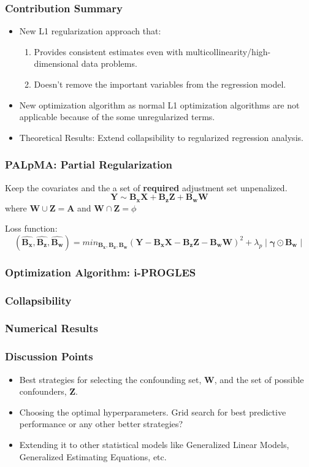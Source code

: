 \documentclass{beamer}
\begin{document}
\begin{frame}
	\frametitle{Contribution Summary}
	\begin{itemize}
		\item New L1 regularization approach that:
			\begin{enumerate}
				\item Provides consistent estimates even with
					multicollinearity/high-dimensional data
					problems.
				\item Doesn't remove the important variables
					from the regression model.
			\end{enumerate}
		\item New optimization algorithm as normal L1 optimization algorithms are not applicable because of the some unregularized terms.
		\item Theoretical Results: Extend collapsibility to regularized regression analysis.
	\end{itemize}
\end{frame}

\begin{frame}
	\frametitle{PALpMA: Partial Regularization}
	Keep the covariates and the a set of \textbf{required} adjustment set unpenalized.
	$$ \bm{Y} \sim \bm{B_x X} + \bm{B_z Z} + \bm{B_w W} $$ 
	where $ \bm{W} \cup \bm{Z} = \bm{A} $ and $ \bm{W} \cap \bm{Z} = \phi $
	
	Loss function:
	$$ (\bm{\hat{B_x}}, \bm{\hat{B_z}}, \bm{\hat{B_w}}) = min_{\bm{B_x}, \bm{B_z}, \bm{B_w}} (\bm{Y} - \bm{B_x X} - \bm{B_z Z} - \bm{B_w W})^2 + \lambda_p \mid \bm{\gamma} \odot \bm{B_w} \mid $$

\end{frame}

\begin{frame}
	\frametitle{Optimization Algorithm: i-PROGLES}
\end{frame}

\begin{frame}
	\frametitle{Collapsibility}
\end{frame}

\begin{frame}
	\frametitle{Numerical Results}
\end{frame}

\begin{frame}
	\frametitle{Discussion Points}
	\begin{itemize}
		\item Best strategies for selecting the confounding set, $
			\bm{W} $, and the set of possible confounders, $ \bm{Z} $.
		\item Choosing the optimal hyperparameters. Grid search for best 
			predictive performance or any other better strategies?
		\item Extending it to other statistical models like Generalized
			Linear Models, Generalized Estimating Equations, etc.
	\end{itemize}
\end{frame}
\end{document}
